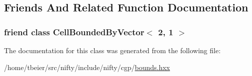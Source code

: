 \subsection{Friends And Related Function Documentation}
\hypertarget{classnifty_1_1cgp_1_1CellBoundedBy_3_012_00_011_01_4_abdb37afb9b659d234727be05e2560e42}{}
\subsubsection[{Cell\+Bounded\+By\+Vector$<$ 2, 1 $>$}]{\setlength{\rightskip}{0pt plus 5cm}friend class {\bf Cell\+Bounded\+By\+Vector}$<$ 2, 1 $>$\hspace{0.3cm}{\ttfamily [friend]}}\label{classnifty_1_1cgp_1_1CellBoundedBy_3_012_00_011_01_4_abdb37afb9b659d234727be05e2560e42}


The documentation for this class was generated from the following file\+:\begin{DoxyCompactItemize}
\item 
/home/tbeier/src/nifty/include/nifty/cgp/\hyperlink{bounds_8hxx}{bounds.\+hxx}\end{DoxyCompactItemize}
